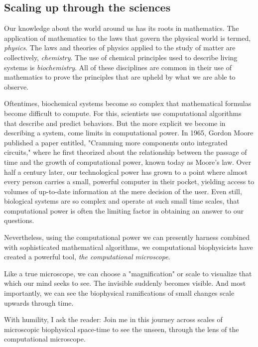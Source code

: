 \documentclass[12pt]{ucsddissertation}
\begin{document}
\begin{dissertationintroduction}
\section{Scaling up through the sciences}
Our knowledge about the world around us has its roots in mathematics. The application of mathematics to the laws that govern the physical world is termed, \textit{physics}. The laws and theories of physics applied to the study of matter are collectively, \textit{chemistry}. The use of chemical principles used to describe living systems is \textit{biochemistry}. All of these disciplines are common in their use of mathematics to prove the principles that are upheld by what we are able to observe. 

Oftentimes, biochemical systems become so complex that mathematical formulas become difficult to compute. For this, scientists use computational algorithms that describe and predict behaviors. But the more explicit we become in describing a system, come limits in computational power. In 1965, Gordon Moore published a paper entitled, "Cramming more components onto integrated circuits," \cite{Moore1965} where he first theorized about the relationship between the passage of time and the growth of computational power, known today as Moore's law. Over half a century later, our technological power has grown to a point where almost every person carries a small, powerful computer in their pocket, yielding access to volumes of up-to-date information at the mere decision of the user. Even still, biological systems are so complex and operate at such small time scales, that computational power is often the limiting factor in obtaining an answer to our questions. 

Nevertheless, using the computational power we can presently harness combined with sophisticated mathematical algorithms, we computational biophysicists have created a powerful tool, \textit{the computational microscope}. 

Like a true microscope, we can choose a "magnification" or scale to visualize that which our mind seeks to see. The invisible suddenly becomes visible. And most importantly, we can see the biophysical ramifications of small changes scale upwards through time. 

With humility, I ask the reader: Join me in this journey across scales of microscopic biophysical space-time to see the unseen, through the lens of the computational microscope. 


\end{dissertationintroduction}
\end{document}
